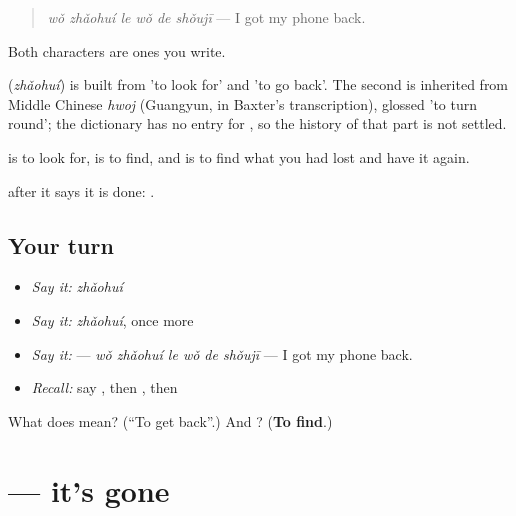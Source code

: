 \begin{quote}
\textbf{} \emph{wǒ zhǎohuí le wǒ de shǒujī} — I got my phone back.
\end{quote}

Both characters are ones you write.

\begin{cousinweb}
\textbf{} (\emph{zhǎohuí}) is built from  'to look for' and  'to go back'. The second is inherited from Middle Chinese \emph{hwoj} (Guangyun, in Baxter's transcription), glossed 'to turn round'; the dictionary has no entry for , so the history of that part is not settled.
\end{cousinweb}

\begin{grammarlens}[title={What you've built}]
 is to look for,  is to find, and  is to find what you had lost and have it again.

 after it says it is done: .
\end{grammarlens}

\subsection*{Your turn}
\begin{itemize}
\raggedright
  \item \emph{Say it:} \emph{zhǎohuí}
  \item \emph{Say it:} \emph{zhǎohuí}, once more
  \item \emph{Say it:}  — \emph{wǒ zhǎohuí le wǒ de shǒujī} — I got my phone back.
  \item \emph{Recall:} say , then , then 
\end{itemize}

\begin{tcolorbox}[breakable,colback=teal!4,colframe=teal!35!black,title={Before you move on}]
What does  mean? (\textquotedblleft{}To get back\textquotedblright{}.) And ? (\textbf{To find}.)
\end{tcolorbox}
\section[\texorpdfstring{\zh{我的手机不见了} (wǒ de shǒujī bú jiàn le)}{我的手机不见了 (wǒ de shǒujī bú jiàn le)}]{ — it's gone}

\label{lesson:ZH-C285-problem}



